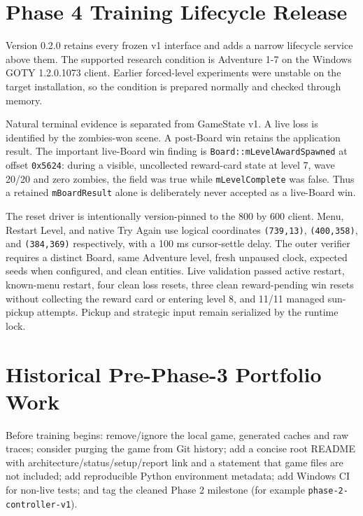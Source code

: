 \documentclass[11pt,a4paper]{article}
\begin{document}
\section{Phase 4 Training Lifecycle Release}
Version 0.2.0 retains every frozen v1 interface and adds a narrow lifecycle
service above them. The supported research condition is Adventure 1-7 on the
Windows GOTY 1.2.0.1073 client. Earlier forced-level experiments were unstable
on the target installation, so the condition is prepared normally and checked
through memory.

Natural terminal evidence is separated from GameState v1. A live loss is
identified by the zombies-won scene. A post-Board win retains the application
result. The important live-Board win finding is
\texttt{Board::mLevelAwardSpawned} at offset \texttt{0x5624}: during a visible,
uncollected reward-card state at level 7, wave 20/20 and zero zombies, the
field was true while \texttt{mLevelComplete} was false. Thus a retained
\texttt{mBoardResult} alone is deliberately never accepted as a live-Board win.

The reset driver is intentionally version-pinned to the 800 by 600 client.
Menu, Restart Level, and native Try Again use logical coordinates
\texttt{(739,13)}, \texttt{(400,358)}, and \texttt{(384,369)} respectively,
with a 100 ms cursor-settle delay. The outer verifier requires a distinct
Board, same Adventure level, fresh unpaused clock, expected seeds when
configured, and clean entities. Live validation passed active restart,
known-menu restart, four clean loss resets, three clean reward-pending win
resets without collecting the reward card or entering level 8, and 11/11
managed sun-pickup attempts. Pickup and strategic input remain serialized by
the runtime lock.

\section{Historical Pre-Phase-3 Portfolio Work}
Before training begins: remove/ignore the local game, generated caches and raw traces; consider purging the game from Git history; add a concise root README with architecture/status/setup/report link and a statement that game files are not included; add reproducible Python environment metadata; add Windows CI for non-live tests; and tag the cleaned Phase 2 milestone (for example \texttt{phase-2-controller-v1}).
\end{document}
